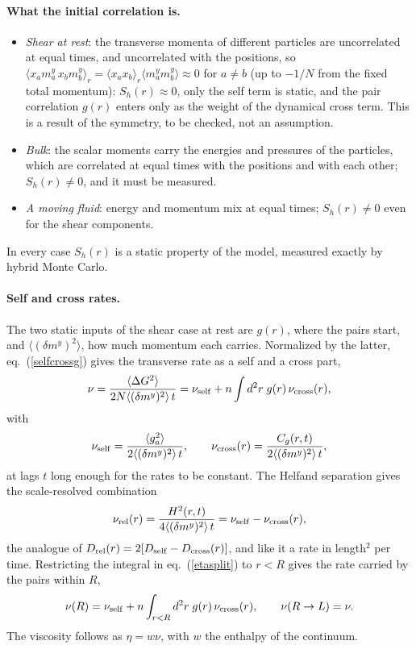 \documentclass[11pt,aps,preprint,nofootinbib,superscriptaddress,tightenlines]{revtex4-2}
\def\st{\begin{equation}}
\def\stp{\end{equation}}
\def\Eq#1{eq.~(\ref{#1})}
\newcommand{\avg}[1]{\langle #1\rangle}
\let\oldparagraph\paragraph
\renewcommand{\paragraph}{\par\bigskip\oldparagraph}
\begin{document}
\paragraph{What the initial correlation is.}
\begin{itemize}
\item \emph{Shear at rest}: the transverse momenta of different particles are uncorrelated at equal times, and uncorrelated with the
  positions, so $\avg{x_am_a^y\,x_bm_b^y}_r=\avg{x_ax_b}_r\avg{m_a^ym_b^y}\approx0$ for $a\neq b$ (up to $-1/N$ from the fixed total momentum): $S_h(r)\approx0$,
  only the self term is static, and the pair correlation $g(r)$ enters only as the weight of the dynamical cross term.  This is a result
  of the symmetry, to be checked, not an assumption.
\item \emph{Bulk}: the scalar moments carry the energies and pressures of the particles, which are correlated at equal times with the
  positions and with each other; $S_h(r)\neq0$, and it must be measured.
\item \emph{A moving fluid}: energy and momentum mix at equal times; $S_h(r)\neq0$ even for the shear components.
\end{itemize}
In every case $S_h(r)$ is a static property of the model, measured exactly by hybrid Monte Carlo.

\paragraph{Self and cross rates.}  The two static inputs of the shear case at rest are $g(r)$, where the pairs start, and $\avg{(\delta m^y)^2}$, how
much momentum each carries.  Normalized by the latter, \Eq{selfcrossg} gives the transverse rate as a self and a cross part,
\st
\nu=\frac{\avg{\Delta G^2}}{2N\avg{(\delta m^y)^2}\,t}=\nu_{\rm self}+n\int d^2r\;g(r)\,\nu_{\rm cross}(r),
\label{etasplit}
\stp
with
\st
\nu_{\rm self}=\frac{\avg{g_a^2}}{2\avg{(\delta m^y)^2}\,t},\qquad
\nu_{\rm cross}(r)=\frac{C_g(r,t)}{2\avg{(\delta m^y)^2}\,t},
\stp
at lags $t$ long enough for the rates to be constant.  The Helfand separation gives the scale-resolved combination
\st
\nu_{\rm rel}(r)=\frac{H^2(r,t)}{4\avg{(\delta m^y)^2}\,t}=\nu_{\rm self}-\nu_{\rm cross}(r) ,
\stp
the analogue of $D_{\rm rel}(r)=2[D_{\rm self}-D_{\rm cross}(r)]$, and like it a rate in length$^2$ per time.  Restricting the integral in \Eq{etasplit} to
$r<R$ gives the rate carried by the pairs within $R$,
\st
\nu(R)=\nu_{\rm self}+n\int_{r<R}d^2r\;g(r)\,\nu_{\rm cross}(r),\qquad \nu(R\to L)=\nu .
\label{etaR}
\stp
The viscosity follows as $\eta=w\nu$, with $w$ the enthalpy of the continuum.
\end{document}
